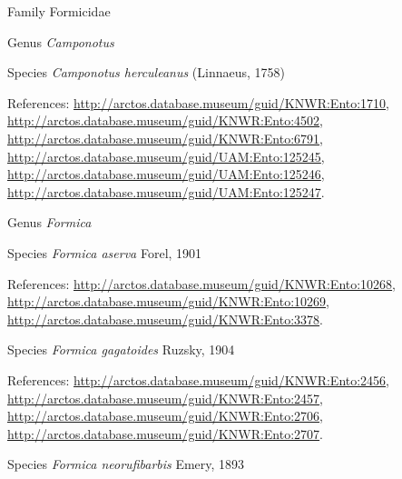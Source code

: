\documentclass[9pt, article]{memoir}
\begin{document}
\begin{multicols}{2}
\vspace{6pt}\noindent\hspace{24pt}Family Formicidae


\vspace{6pt}\noindent\hspace{30pt}Genus \textit{Camponotus}


\vspace{6pt}\noindent\hspace{36pt}Species \textit{Camponotus herculeanus} (Linnaeus, 1758)


\vspace{6pt}References: 
\url{http://arctos.database.museum/guid/KNWR:Ento:1710}, 
\url{http://arctos.database.museum/guid/KNWR:Ento:4502}, 
\url{http://arctos.database.museum/guid/KNWR:Ento:6791}, 
\url{http://arctos.database.museum/guid/UAM:Ento:125245}, 
\url{http://arctos.database.museum/guid/UAM:Ento:125246}, 
\url{http://arctos.database.museum/guid/UAM:Ento:125247}.

\vspace{6pt}\noindent\hspace{30pt}Genus \textit{Formica}


\vspace{6pt}\noindent\hspace{36pt}Species \textit{Formica aserva} Forel, 1901


\vspace{6pt}References: 
\url{http://arctos.database.museum/guid/KNWR:Ento:10268}, 
\url{http://arctos.database.museum/guid/KNWR:Ento:10269}, 
\url{http://arctos.database.museum/guid/KNWR:Ento:3378}.

\vspace{6pt}\noindent\hspace{36pt}Species \textit{Formica gagatoides} Ruzsky, 1904


\vspace{6pt}References: 
\url{http://arctos.database.museum/guid/KNWR:Ento:2456}, 
\url{http://arctos.database.museum/guid/KNWR:Ento:2457}, 
\url{http://arctos.database.museum/guid/KNWR:Ento:2706}, 
\url{http://arctos.database.museum/guid/KNWR:Ento:2707}.

\vspace{6pt}\noindent\hspace{36pt}Species \textit{Formica neorufibarbis} Emery, 1893



\end{multicols}
\end{document}
